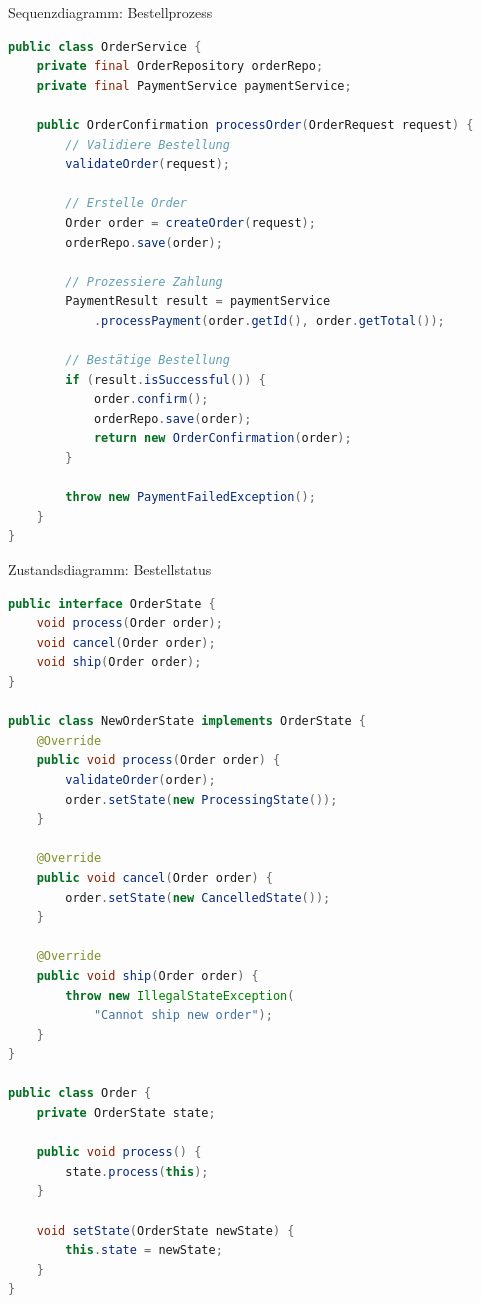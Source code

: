 \begin{example2}{Sequenzdiagramm: Bestellprozess}
\begin{lstlisting}[language=Java, style=basesmol]
public class OrderService {
    private final OrderRepository orderRepo;
    private final PaymentService paymentService;
    
    public OrderConfirmation processOrder(OrderRequest request) {
        // Validiere Bestellung
        validateOrder(request);
        
        // Erstelle Order
        Order order = createOrder(request);
        orderRepo.save(order);
        
        // Prozessiere Zahlung
        PaymentResult result = paymentService
            .processPayment(order.getId(), order.getTotal());
            
        // Bestätige Bestellung
        if (result.isSuccessful()) {
            order.confirm();
            orderRepo.save(order);
            return new OrderConfirmation(order);
        }
        
        throw new PaymentFailedException();
    }
}
\end{lstlisting}
\end{example2}

\begin{example2}{Zustandsdiagramm: Bestellstatus}
\begin{lstlisting}[language=Java, style=basesmol]
public interface OrderState {
    void process(Order order);
    void cancel(Order order);
    void ship(Order order);
}

public class NewOrderState implements OrderState {
    @Override
    public void process(Order order) {
        validateOrder(order);
        order.setState(new ProcessingState());
    }
    
    @Override
    public void cancel(Order order) {
        order.setState(new CancelledState());
    }
    
    @Override
    public void ship(Order order) {
        throw new IllegalStateException(
            "Cannot ship new order");
    }
}

public class Order {
    private OrderState state;
    
    public void process() {
        state.process(this);
    }
    
    void setState(OrderState newState) {
        this.state = newState;
    }
}
\end{lstlisting}
\end{example2}

